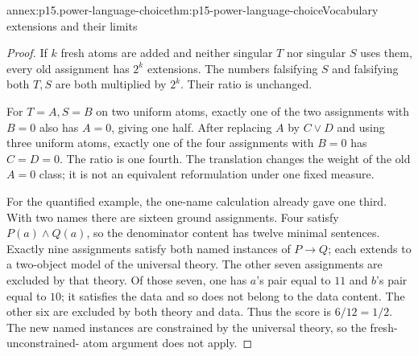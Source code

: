 \begin{annexitem}{annex:p15.power-language-choice}{thm:p15-power-language-choice}{Vocabulary extensions and their limits}
\begin{proof}
If \(k\) fresh atoms
are added and neither
singular \(T\) nor
singular \(S\) uses
them, every old
assignment has
\(2^k\) extensions.
The numbers falsifying
\(S\) and falsifying
both \(T,S\) are
both multiplied
by \(2^k\).
Their ratio is
unchanged.

For \(T=A,S=B\)
on two uniform
atoms, exactly
one of the two
assignments with
\(B=0\) also
has \(A=0\),
giving one half.
After replacing
\(A\) by \(C\lor D\)
and using three
uniform atoms,
exactly one of
the four assignments
with \(B=0\)
has \(C=D=0\).
The ratio is
one fourth.
The translation
changes the weight
of the old
\(A=0\) class;
it is not an
equivalent reformulation
under one fixed
measure.

For the quantified
example, the one-name
calculation already
gave one third.
With two names
there are sixteen
ground assignments.
Four satisfy
\(P(a)\land Q(a)\),
so the denominator
content has twelve
minimal sentences.
Exactly nine assignments
satisfy both named
instances of \(P\to Q\);
each extends to
a two-object model
of the universal
theory. The other
seven assignments
are excluded by
that theory.
Of those seven,
one has \(a\)'s
pair equal to
\(11\) and \(b\)'s
pair equal to
\(10\); it satisfies
the data and so
does not belong
to the data content.
The other six
are excluded by
both theory and
data. Thus the
score is \(6/12=1/2\).
The new named
instances are
constrained by the
universal theory,
so the fresh-unconstrained-
atom argument does
not apply.
\end{proof}
\end{annexitem}

